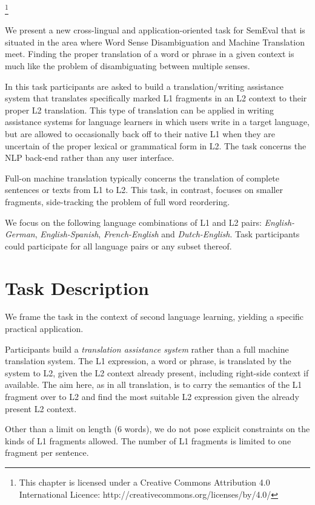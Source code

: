 \footnote{This chapter is licensed under a Creative Commons Attribution 4.0 International Licence: http://creativecommons.org/licenses/by/4.0/}   

We present a new cross-lingual and application-oriented task for SemEval that
is situated in the area where Word Sense Disambiguation and Machine Translation
meet. Finding the proper translation of a word or phrase in a given context is
much like the problem of disambiguating between multiple senses.

In this task participants are asked to build a translation/writing assistance
system that translates specifically marked L1 fragments in an L2 context to
their proper L2 translation. This type of translation can be applied in writing
assistance systems for language learners in which users write in a target
language, but are allowed to occasionally back off to their native L1 when they
are uncertain of the proper lexical or grammatical form in L2. The task
concerns the NLP back-end rather than any user interface.

Full-on machine translation typically concerns the translation of complete
sentences or texts from L1 to L2. This task, in contrast, focuses on smaller
fragments, side-tracking the problem of full word reordering.


We focus on the following language combinations of L1 and L2 pairs:
\emph{English-German}, \emph{English-Spanish}, \emph{French-English} and
\emph{Dutch-English}. Task participants could participate for all language
pairs or any subset thereof.


\section{Task Description}

We frame the task in the context of second language learning, yielding a
specific practical application. 

Participants build a \emph{translation assistance system}\/ rather than a full
machine translation system. The L1 expression, a word or phrase, is translated
by the system to L2, given the L2 context already present, including right-side
context if available. The aim here, as in all translation, is to carry the
semantics of the L1 fragment over to L2 and find the most suitable L2
expression given the already present L2 context. 

Other than a limit on length (6 words), we do not pose explicit constraints on
the kinds of L1 fragments allowed. The number of L1 fragments is limited to one
fragment per sentence.

